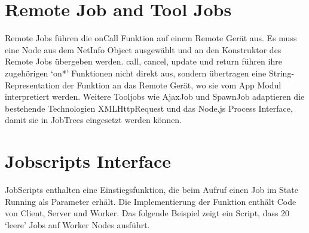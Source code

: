\section{Remote Job and Tool Jobs}
Remote Jobs führen die onCall Funktion auf einem Remote Gerät aus.
Es muss eine Node aus dem NetInfo Object ausgewählt und an den Konstruktor des Remote Jobs übergeben werden.
call, cancel, update und return führen ihre zugehörigen ‘on*’ Funktionen nicht direkt aus, sondern übertragen eine String-Representation der Funktion an das Remote Gerät, wo sie vom App Modul interpretiert werden.
Weitere Tooljobs wie AjaxJob und SpawnJob adaptieren die bestehende Technologien XMLHttpRequest und das Node.js Process Interface, damit sie in JobTrees eingesetzt werden können.




\section{Jobscripts Interface}
JobScripts enthalten eine Einstiegsfunktion, die beim Aufruf einen Job im State Running als Parameter erhält.
Die Implementierung der Funktion enthält Code von Client, Server und Worker.
Das folgende Beispiel zeigt ein Script, dass 20 ‘leere’ Jobs auf Worker Nodes ausführt.
